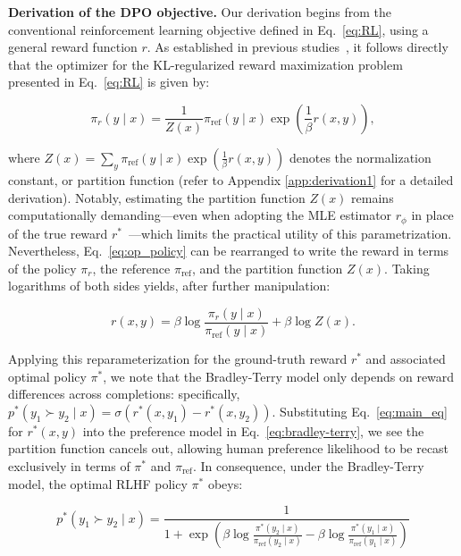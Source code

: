 \textbf{Derivation of the DPO objective.} Our derivation begins from the conventional reinforcement learning objective defined in Eq.~\ref{eq:RL}, using a general reward function $r$. As established in previous studies~\citep{peters2007reinforcement, peng2019advantage, korbak2022reinforcement, go2023aligning}, it follows directly that the optimizer for the KL-regularized reward maximization problem presented in Eq.~\ref{eq:RL} is given by:

\begin{equation}\label{eq:op_policy}
    \pi_r(y\mid x) = \frac{1}{Z(x)}\pi_\text{ref}(y\mid x)\exp\left(\frac{1}{\beta}r(x, y)\right),
\end{equation}

where $Z(x) =\sum_{y}\pi_\text{ref}(y\mid x)\exp\left(\frac{1}{\beta}r(x, y)\right)$ denotes the normalization constant, or partition function (refer to Appendix \ref{app:derivation1} for a detailed derivation). Notably, estimating the partition function $Z(x)$ remains computationally demanding—even when adopting the MLE estimator $r_{\phi}$ in place of the true reward $r^*$~\citep{korbak2022reinforcement, go2023aligning}—which limits the practical utility of this parametrization. Nevertheless, Eq.~\ref{eq:op_policy} can be rearranged to write the reward in terms of the policy $\pi_r$, the reference $\pi_\text{ref}$, and the partition function $Z(x)$. Taking logarithms of both sides yields, after further manipulation:

\begin{equation}\label{eq:main_eq}
    r(x,y) =\beta \log \frac{\pi_r(y\mid x)}{\pi_\text{ref}(y\mid x)} + \beta \log Z(x).
\end{equation}

Applying this reparameterization for the ground-truth reward $r^*$ and associated optimal policy $\pi^*$, we note that the Bradley-Terry model only depends on reward differences across completions: specifically, ${p^*(y_1 \succ y_2 \mid x) = \sigma(r^*(x, y_1) - r^*(x, y_2))}$. Substituting Eq.~\ref{eq:main_eq} for $r^*(x, y)$ into the preference model in Eq.~\ref{eq:bradley-terry}, we see the partition function cancels out, allowing human preference likelihood to be recast exclusively in terms of $\pi^*$ and $\pi_\text{ref}$. In consequence, under the Bradley-Terry model, the optimal RLHF policy $\pi^*$ obeys:

\begin{equation}\label{eq:objective}
    p^*(y_1\succ y_2 \mid x)=\frac{1}{1 + \exp\left(\beta \log \frac{\pi^*(y_2\mid x)}{\pi_\text{ref}(y_2\mid x)} - \beta \log \frac{\pi^*(y_1\mid x)}{\pi_\text{ref}(y_1\mid x)}\right)}
\end{equation}

